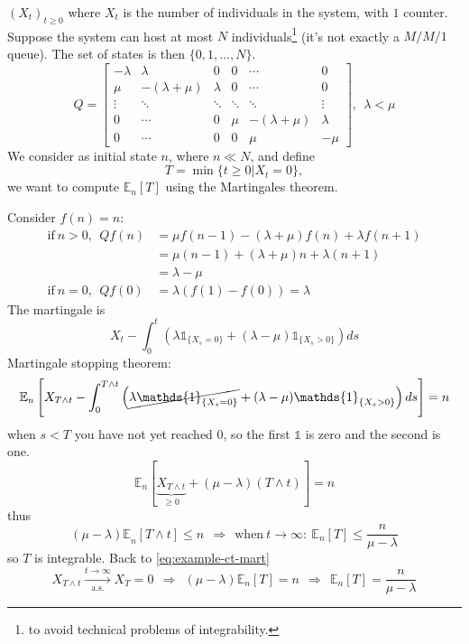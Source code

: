 \documentclass[10pt,a4paper]{article}
\theoremstyle{definition}
\newcommand{\ind}{\mathds{1}}
\begin{document}
		$( X_{t})_{t\geq 0}$ where $X_{t}$ is the number of individuals in the system, with $1$ counter. Suppose the system can host at most $N$ individuals\footnote{to avoid technical problems of integrability.} (it's not exactly a $M/M/1$ queue). The set of states is then $\{0,1,\dotsc ,N\}$.
\begin{equation*}
	Q=\begin{bmatrix}
	-\lambda  & \lambda  & 0 & 0 & \cdots  & 0\\
	\mu  & -( \lambda +\mu ) & \lambda  & 0 & \cdots  & 0\\
	\vdots  & \ddots  & \ddots  & \ddots  & \ddots  & \vdots \\
	0 & \cdots  & 0 & \mu  & -( \lambda +\mu ) & \lambda \\
	0 & \cdots  & 0 & 0 & \mu  & -\mu 
	\end{bmatrix} ,\ \ \lambda < \mu 
\end{equation*}
We consider as initial state $n$, where $n\ll N$, and define
\begin{equation*}
	T=\min\{t\geq 0|X_{t} =0\} ,
\end{equation*}
we want to compute $\mathbb{E}_{n}[ T]$ using the Martingales theorem.

Consider $f( n) =n$:
\begin{align*}
	\text{if} \ n >0,\ \ Qf( n) & =\mu f( n-1) -( \lambda +\mu ) f( n) +\lambda f( n+1) \\
	                            & =\mu ( n-1) +( \lambda +\mu ) n+\lambda ( n+1)        \\
	                            & =\lambda -\mu                                         \\
	\text{if} \ n=0,\ \ Qf( 0)  & =\lambda ( f( 1) -f( 0)) =\lambda                     
\end{align*}
The martingale is
\begin{equation*}
	X_{t} -\int _{0}^{t}( \lambda \ind_{\{X_{s} =0\}} +( \lambda -\mu )\ind_{\{X_{s}  >0\}}) ds
\end{equation*}
Martingale stopping theorem:
\begin{equation*}
	\mathbb{E}_{n}\left[ X_{T\land t} -\int _{0}^{T\land t}\left(\cancel{\lambda \ind_{\{X_{s} =0\}}} +( \lambda -\mu )\ind_{\{X_{s}  >0\}}\right) ds\right] =n
\end{equation*}
when $s< T$ you have not yet reached $0$, so the first $\ind$ is zero and the second is one.
\begin{equation}
	\mathbb{E}_{n}[\underbrace{X_{T\land t}}_{\geq 0} +( \mu -\lambda )( T\land t)] =n
	\label{eq:example-ct-mart}
\end{equation}
thus
\begin{equation*}
	\mathbb{( \mu -\lambda ) E}_{n}[ T\land t] \leq n\ \ \Rightarrow \ \ \text{when} \ t\rightarrow \infty :\ \mathbb{E}_{n}[ T] \leq \frac{n}{\mu -\lambda }
\end{equation*}
so $T$ is integrable. Back to \eqref{eq:example-ct-mart}
\begin{equation*}
	X_{T\land t}\xrightarrow[\text{a.s.}]{t\rightarrow \infty } X_{T} =0\ \ \Rightarrow \ \ ( \mu -\lambda )\mathbb{E}_{n}[ T] =n\ \ \Rightarrow \ \ \mathbb{E}_{n}[ T] =\frac{n}{\mu -\lambda }
		\end{equation*}
\end{document}
